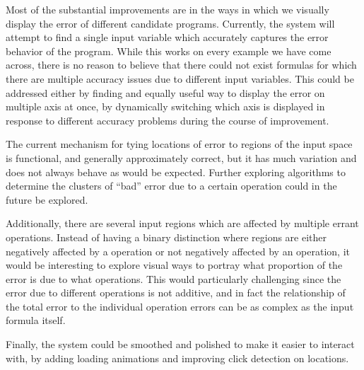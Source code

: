 \documentclass{chi2009}
\begin{document}
Most of the substantial improvements are in the ways in which we
visually display the error of different candidate programs. Currently,
the system will attempt to find a single input variable which
accurately captures the error behavior of the program. While this
works on every example we have come across, there is no reason to
believe that there could not exist formulas for which there are
multiple accuracy issues due to different input variables. This could
be addressed either by finding and equally useful way to display the
error on multiple axis at once, by dynamically switching which axis is
displayed in response to different accuracy problems during the course
of improvement.

The current mechanism for tying locations of error to regions of the
input space is functional, and generally approximately correct, but it
has much variation and does not always behave as would be
expected. Further exploring algorithms to determine the clusters of
``bad'' error due to a certain operation could in the future be
explored.

Additionally, there are several input regions which are affected by
multiple errant operations. Instead of having a binary distinction
where regions are either negatively affected by a operation or not
negatively affected by an operation, it would be interesting to
explore visual ways to portray what proportion of the error is due to
what operations. This would particularly challenging since the error
due to different operations is not additive, and in fact the
relationship of the total error to the individual operation errors can
be as complex as the input formula itself.

Finally, the system could be smoothed and polished to make it easier
to interact with, by adding loading animations and improving click
detection on locations.



\end{document}
